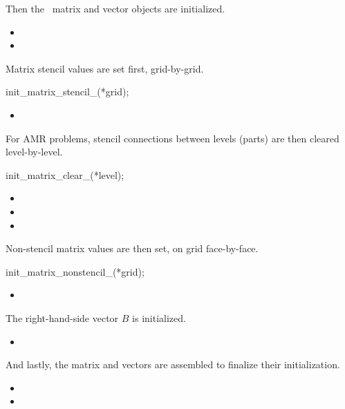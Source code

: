 \documentclass[10pt]{article}
\begin{document}
Then the \hypre\ matrix and vector objects are initialized.

\begin{itemize}
\item {}
\item {}
\end{itemize}

Matrix stencil values are set first, grid-by-grid.

      init\_matrix\_stencil\_(*grid);

\begin{itemize}
\item {}
\end{itemize}

For AMR problems, stencil connections between levels (parts) are then
cleared level-by-level.

    init\_matrix\_clear\_(*level);

\begin{itemize}
\item {}
\item {}
\item {}
\end{itemize}

Non-stencil matrix values are then set, on grid face-by-face.

      init\_matrix\_nonstencil\_(*grid);

\begin{itemize}
\item {}
\end{itemize}

The right-hand-side vector $B$ is initialized.

\begin{itemize}
\item {}
\end{itemize}

And lastly, the matrix and vectors are assembled to finalize their
initialization.

\begin{itemize}
\item {}
\item {}
\end{itemize}
\end{document}
